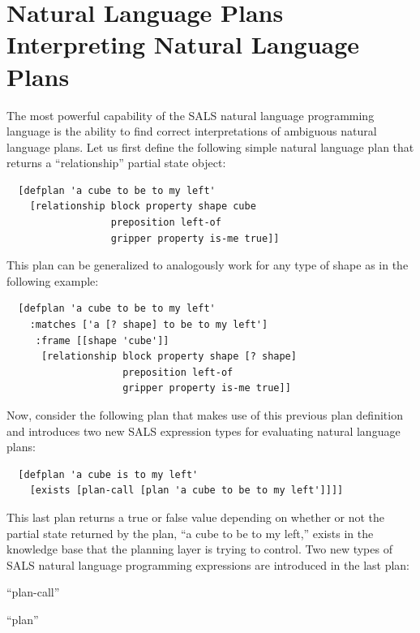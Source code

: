 \section{Natural Language Plans Interpreting Natural Language Plans}
\label{section:natural_language_plans_interpreting_natural_language_plans}

The most powerful capability of the SALS natural language programming
language is the ability to find correct interpretations of ambiguous
natural language plans.  Let us first define the following simple
natural language plan that returns a ``relationship'' partial state
object:
\begin{samepage}
\begin{Verbatim}
  [defplan 'a cube to be to my left'
    [relationship block property shape cube
                  preposition left-of
                  gripper property is-me true]]
\end{Verbatim}
\end{samepage}
This plan can be generalized to analogously work for any type of shape
as in the following example:
\begin{samepage}
\begin{Verbatim}
  [defplan 'a cube to be to my left'
    :matches ['a [? shape] to be to my left']
     :frame [[shape 'cube']]
      [relationship block property shape [? shape]
                    preposition left-of
                    gripper property is-me true]]
\end{Verbatim}
\end{samepage}
Now, consider the following plan that makes use of this previous plan
definition and introduces two new SALS expression types for evaluating
natural language plans:
\begin{samepage}
\begin{Verbatim}
  [defplan 'a cube is to my left'
    [exists [plan-call [plan 'a cube to be to my left']]]]
\end{Verbatim}
\end{samepage}
This last plan returns a true or false value depending on whether or
not the partial state returned by the plan, ``a cube to be to my
left,'' exists in the knowledge base that the planning layer is trying
to control.  Two new types of SALS natural language programming
expressions are introduced in the last plan:
\begin{packed_enumerate}
\item{``plan-call''}
\item{``plan''}
\end{packed_enumerate}
